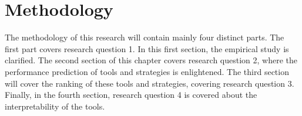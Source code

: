 \chapter{Methodology}
\label{chap:methodology}
The methodology of this research will contain mainly four distinct parts. The first part covers research question 1. In this first section, the empirical study is clarified. The second section of this chapter covers research question 2, where the performance prediction of tools and strategies is enlightened. The third section will cover the ranking of these tools and strategies, covering research question 3. Finally, in the fourth section, research question 4 is covered about the interpretability of the tools.





